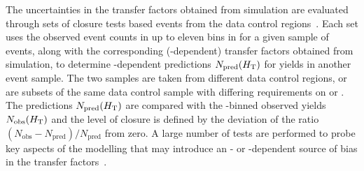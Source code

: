 The uncertainties in the transfer factors obtained from simulation are
evaluated through sets of closure tests based events from the data
control regions~\cite{RA1Paper2012}. Each set uses the observed event
counts in up to eleven bins in \scalht for a given sample of events,
along with the corresponding (\scalht-dependent) transfer factors
obtained from simulation, to determine \scalht-dependent predictions
$N_\text{pred}(H_\text{T})$ for yields in another event sample. The two
samples are taken from different data control regions, or are subsets
of the same data control sample with differing requirements on \njet
or \nb. The predictions $N_\text{pred}(H_\text{T})$ are compared with the
\scalht-binned observed yields $N_\text{obs}(H_\text{T})$ and the level
of closure is defined by the deviation of the ratio $(N_\text{obs} -
N_\text{pred})/N_\text{pred}$ from zero. A large number of tests are
performed to probe key aspects of the modelling that may introduce an
\njet- or \scalht-dependent source of bias in the transfer
factors~\cite{RA1Paper2012}.

